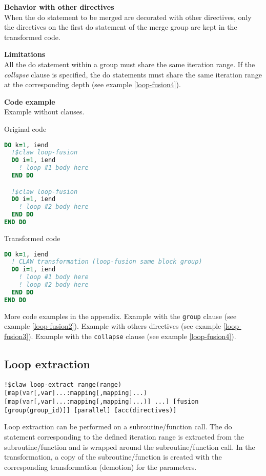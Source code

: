 \textbf{Behavior with other directives}\\
When the do statement to be merged are decorated with other directives, only the
directives on the first do statement of the merge group are kept in the transformed
code.

\textbf{Limitations}\\
All the do statement within a group must share the same iteration range. If the
\textit{collapse} clause is specified, the do statements must share the same iteration range at the
corresponding depth (see example \ref{loop-fusion4}).

\textbf{Code example}\\
\label{loop-fusion-1}
Example without clauses.

Original code
\begin{lstlisting}[language=Fortran]
DO k=1, iend
  !$claw loop-fusion
  DO i=1, iend
    ! loop #1 body here
  END DO

  !$claw loop-fusion
  DO i=1, iend
    ! loop #2 body here
  END DO
END DO
\end{lstlisting}

Transformed code
\begin{lstlisting}[language=Fortran]
DO k=1, iend
  ! CLAW transformation (loop-fusion same block group)
  DO i=1, iend
    ! loop #1 body here
    ! loop #2 body here
  END DO
END DO
\end{lstlisting}

More code examples in the appendix. Example with the \lstinline!group! clause (see example \ref{loop-fusion2}). Example with others directives (see example \ref{loop-fusion3}). Example with the \lstinline!collapse! clause (see example \ref{loop-fusion4}).

\subsection{Loop extraction}
\begin{lstlisting}
!$claw loop-extract range(range) [map(var[,var]...:mapping[,mapping]...) [map(var[,var]...:mapping[,mapping]...)] ...] [fusion [group(group_id)]] [parallel] [acc(directives)]
\end{lstlisting}

Loop extraction can be performed on a subroutine/function call. The do statement corresponding
to the defined iteration range is extracted from the subroutine/function and is wrapped
around the subroutine/function call. In the transformation, a copy of the subroutine/function
is created with the corresponding transformation (demotion) for the parameters.


